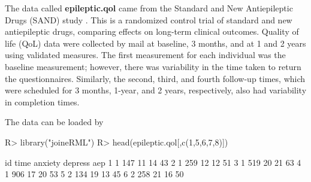 The data called \textbf{epileptic.qol} came from the Standard and New Antiepileptic Drugs (SAND) study \citep{Marson2007}. This is a randomized control trial of standard and new antiepileptic drugs, comparing effects on long-term clinical outcomes. Quality of life (QoL) data were collected by mail at baseline, 3 months, and at 1 and 2 years using validated measures. The first measurement for each individual was the baseline measurement; however, there was variability in the time taken to return the questionnaires. Similarly, the second, third, and fourth follow-up times, which were scheduled for 3 months, 1-year, and 2 years, respectively, also had variability in completion times. 

The data can be loaded by

\begin{example}
R> library("joineRML")
R> head(epileptic.qol[,c(1,5,6,7,8)])
\end{example}

\begin{example}
  id time anxiety depress aep
1  1  147      11      14  43
2  1  259      12      12  51
3  1  519      20      21  63
4  1  906      17      20  53
5  2  134      19      13  45
6  2  258      21      16  50
\end{example}

